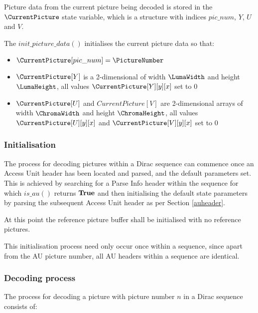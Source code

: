 Picture data from the current picture being decoded is stored in the $\CurrentPicture$ state
variable, which is a structure with indices $pic\_num$, $Y$, $U$ and $V$.


The $init\_picture\_data()$ initialises the current picture data so that:
\begin{itemize}
\item $\CurrentPicture[pic\_num]=\PictureNumber$
\item $\CurrentPicture[Y]$ is a 2-dimensional of width $\LumaWidth$ and height$\LumaHeight$, all values $\CurrentPicture[Y][y][x]$ set to 0
\item $\CurrentPicture[U]$ and $CurrentPicture[V]$ are 2-dimensional arrays of width $\ChromaWidth$ and height $\ChromaHeight$, 
all values $\CurrentPicture[U][y][x]$ and $\CurrentPicture[V][y][x]$ set to 0
\end{itemize}

\subsubsection{Initialisation}
\label{picturedecodinginit}

The process for decoding pictures within a Dirac sequence can commence 
once an Access Unit header has been
located and parsed, and the default parameters set. This is achieved by 
searching for a Parse Info header within the sequence for which
$is\_au()$ returns $\text{\bf{True}}$ and then initialising the default state parameters
 by parsing the subsequent Access Unit header as per Section \ref{auheader}.

At this point the reference picture buffer shall be initialised with no reference pictures.

This initialisation process need only occur once within a sequence, since
apart from the AU picture number, all AU headers within a sequence are
identical. 

\subsubsection{Decoding process}
\label{picturedecprocess}

The process for decoding a picture with picture number 
$n$ in a Dirac sequence consists of:

